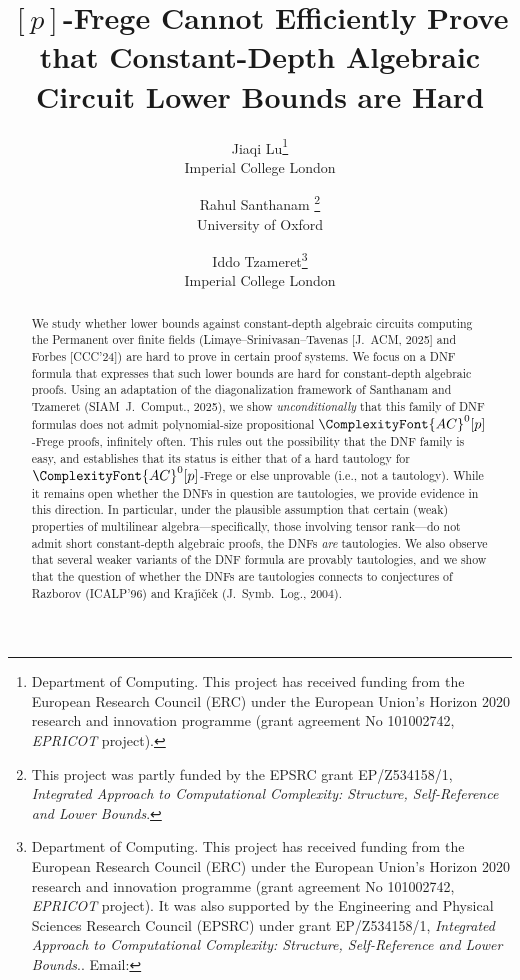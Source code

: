 \documentclass[11pt,letter]{article}
\title{\bf \ACZ$[p]$-Frege Cannot Efficiently Prove that Constant-Depth Algebraic Circuit Lower Bounds are Hard}
\author{
 Jiaqi Lu\thanks{Department of Computing. This project has received funding from the European Research Council (ERC) under the European Union’s Horizon 2020 research and innovation programme (grant agreement No 101002742, \textit{EPRICOT} project).}
 \smallskip
 \\
 \small Imperial College London
 \and 
 Rahul Santhanam%
 \thanks{This project was partly funded by the EPSRC grant EP/Z534158/1, \textit{Integrated Approach to Computational Complexity: Structure, Self-Reference and Lower Bounds}.}
 \smallskip
 \\
 \small University of Oxford
 \and
 Iddo Tzameret\thanks{Department of Computing. This project has received funding from the European Research Council (ERC) under the European Union’s Horizon 2020 research and innovation programme (grant agreement No 101002742, \mbox{\textit{EPRICOT}} project). It was also supported by the Engineering and Physical Sciences Research Council (EPSRC) under grant EP/Z534158/1, \textit{Integrated Approach to Computational Complexity: Structure, Self-Reference and Lower Bounds}.. Email: \text{iddo.tzameret@gmail.com}}
 \\ 
  \small Imperial College London
 }
\theoremstyle{remark} %
\newcommand{\ACZ}{\ensuremath{\ComplexityFont{AC}^0}}
\begin{document}
\maketitle

\thispagestyle{empty} 
  
\begin{abstract}
We study whether lower bounds against constant-depth algebraic circuits computing the Permanent over finite fields (Limaye--Srinivasan--Tavenas [{\footnotesize J.~ACM, 2025}] and Forbes [{\footnotesize CCC'24}]) are hard to prove in certain proof systems.
We focus on a DNF formula that expresses that such lower bounds are hard for constant-depth algebraic proofs. 
Using an adaptation of the diagonalization framework of Santhanam and Tzameret ({\footnotesize SIAM~J.~Comput., 2025}), we show \emph{unconditionally} that this family of DNF formulas does not admit polynomial-size propositional $\ACZ[p]$-Frege proofs, infinitely often.  
This rules out the possibility that the DNF family is easy, and establishes that its status is either that of a hard tautology for $\ACZ[p]$-Frege or else unprovable (i.e., not a tautology).  
While it remains open whether the DNFs in question are tautologies, we provide evidence in this direction.  
In particular, under the plausible assumption that certain (weak) properties of multilinear algebra---specifically, those involving tensor rank---do not admit short constant-depth algebraic proofs, the DNFs \emph{are} tautologies.  
We also observe that several weaker variants of the DNF formula are provably tautologies, and we show that the question of whether the DNFs are tautologies connects to conjectures of Razborov ({\footnotesize ICALP'96}) and Kraj\'{\i}\v{c}ek ({\footnotesize J.~Symb.~Log., 2004}).  




\end{abstract}
\end{document}
